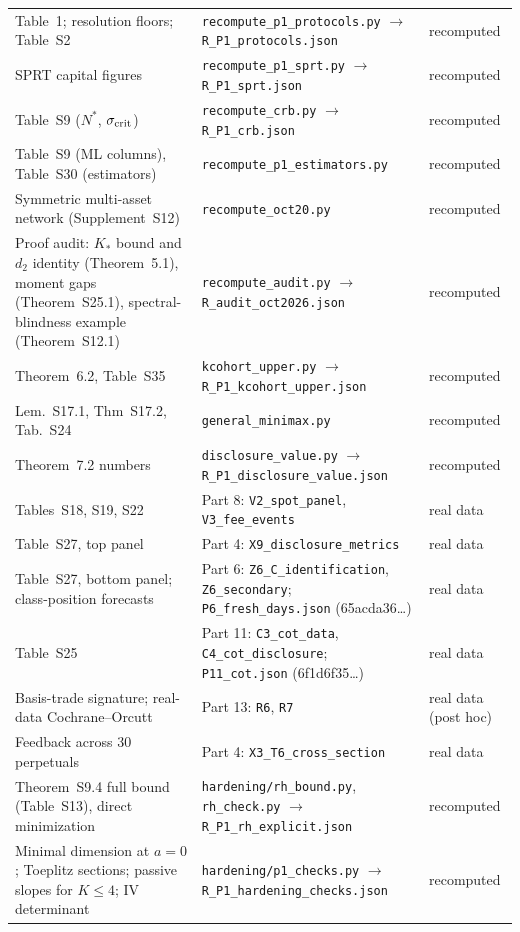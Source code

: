 \documentclass[12pt]{article}
\theoremstyle{definition}
\theoremstyle{remark}
\begin{document}
\begin{longtable}{p{}p{}p{}}
Table~1; resolution floors; Table~S2 & \texttt{recompute\_p1\_protocols.py} $\to$ \texttt{R\_P1\_protocols.json} & recomputed\\
SPRT capital figures & \texttt{recompute\_p1\_sprt.py} $\to$ \texttt{R\_P1\_sprt.json} & recomputed\\
Table~S9 ($N^*$, $\sigma_{\rm crit}$) & \texttt{recompute\_crb.py} $\to$ \texttt{R\_P1\_crb.json} & recomputed\\
Table~S9 (ML columns), Table~S30 (estimators) & \texttt{recompute\_p1\_estimators.py} & recomputed\\
Symmetric multi-asset network (Supplement~S12) & \texttt{recompute\_oct20.py} & recomputed\\
Proof audit: $K_*$ bound and $d_2$ identity (Theorem~5.1), moment gaps (Theorem~S25.1), spectral-blindness example (Theorem~S12.1) & \texttt{recompute\_audit.py} $\to$ \texttt{R\_audit\_oct2026.json} & recomputed\\
Theorem~6.2, Table~S35 & \texttt{kcohort\_upper.py} $\to$ \texttt{R\_P1\_kcohort\_upper.json} & recomputed\\
Lem.~S17.1, Thm~S17.2, Tab.~S24 & \texttt{general\_minimax.py} & recomputed\\
Theorem~7.2 numbers & \texttt{disclosure\_value.py} $\to$ \texttt{R\_P1\_disclosure\_value.json} & recomputed\\
Tables~S18, S19, S22 & Part 8: \texttt{V2\_spot\_panel}, \texttt{V3\_fee\_events} & real data\\
Table~S27, top panel & Part 4: \texttt{X9\_disclosure\_metrics} & real data\\
Table~S27, bottom panel; class-position forecasts & Part 6: \texttt{Z6\_C\_identification}, \texttt{Z6\_secondary}; \texttt{P6\_fresh\_days.json} (65acda36\ldots) & real data\\
Table~S25 & Part 11: \texttt{C3\_cot\_data}, \texttt{C4\_cot\_disclosure}; \texttt{P11\_cot.json} (6f1d6f35\ldots) & real data\\
Basis-trade signature; real-data Cochrane--Orcutt & Part 13: \texttt{R6}, \texttt{R7} & real data (post hoc)\\
Feedback across 30 perpetuals & Part 4: \texttt{X3\_T6\_cross\_section} & real data\\
Theorem~S9.4 full bound (Table~S13), direct minimization & \texttt{hardening/rh\_bound.py}, \texttt{rh\_check.py} $\to$ \texttt{R\_P1\_rh\_explicit.json} & recomputed\\
Minimal dimension at $a=0$; Toeplitz sections; passive slopes for $K\le4$; IV determinant & \texttt{hardening/p1\_checks.py} $\to$ \texttt{R\_P1\_hardening\_checks.json} & recomputed\\

\end{longtable}
\end{document}
